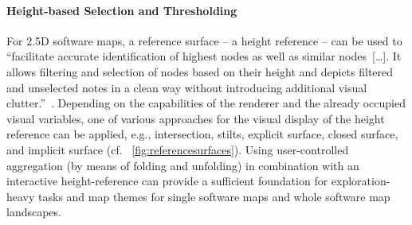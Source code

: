\documentclass[sigconf]{acmart}
\def\eg{e.g., }
\def\cf{cf. }
\begin{document}
\paragraph{Height-based Selection and Thresholding}
For 2.5D software maps, a reference surface -- a height reference -- can be used to \enquote{facilitate accurate identification of highest nodes as well as similar nodes~[\ldots]. It allows filtering and selection of nodes based on their height and depicts filtered and unselected notes in a clean way without introducing additional visual clutter.}~\cite{limberger2018-filtering}.
Depending on the capabilities of the renderer and the already occupied visual variables, one of various approaches for the visual display of the height reference can be applied, \eg intersection, stilts, explicit surface, closed surface, and implicit surface (\cf~\autoref{fig:referencesurfaces}).
Using user-controlled aggregation (by means of folding and unfolding) in combination with an interactive height-reference can provide a sufficient foundation for exploration-heavy tasks and map themes for single software maps and whole software map landscapes.
\end{document}
